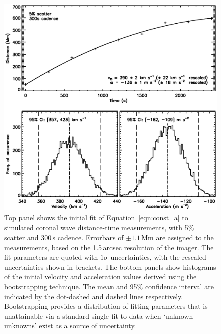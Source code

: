 \documentclass[structabstract]{aa}
\begin{document}
\begin{figure}
\begin{center}
\includegraphics[scale=0.45, trim=20 50 0 0, clip=true]{images/cad_boot_weight_jpb.eps}
\caption{Top panel shows the initial fit of Equation~\ref{eqn:const_a} to simulated coronal wave distance-time measurements, with 5\% scatter and 300\,s cadence. Errorbars of $\pm1.1$\,Mm are assigned to the measurements, based on the 1.5\,arcsec resolution of the imager. The fit parameters are quoted with $1\sigma$ uncertainties, with the rescaled uncertainties shown in brackets. The bottom panels show histograms of the initial velocity and acceleration values derived using the bootstrapping technique. The mean and 95\% confidence interval are indicated by the dot-dashed and dashed lines respectively. Bootstrapping provides a distribution of fitting parameters that is unattainable via a standard single-fit to data when `unknown unknowns' exist as a source of uncertainty.}
\label{cad_boot_weight}
\end{center}
\end{figure}
\end{document}
